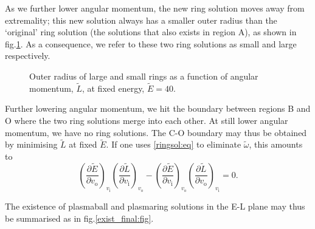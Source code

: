 \documentclass[12pt,a4paper]{article}
\newcommand{\pdiffc}[3][\rule{0mm}{0mm}]{\left (\frac{\partial #2}{\partial {#3}}\right )_{\!\!#1}}
\newcommand{\tB}{\hat{\mathrm{B}}}
\newcommand{\tE}{\widetilde{E}}
\newcommand{\tL}{\widetilde{L}}
\newcommand{\vi}{v_\mathrm{i}}
\newcommand{\vo}{v_\mathrm{o}}
\newcommand{\tw}{\widetilde{\omega}}
\begin{document}
As we further lower angular momentum, the new ring solution moves
away from extremality; this new solution always has a smaller outer
radius than the `original' ring solution (the solutions that also
exists in region A), as shown in fig.\ref{outer:fig}. As a
consequence, we refer to these two ring solutions as small and large
respectively.

\begin{figure}
%
 \begin{center}
   
 \caption{Outer radius of large and small rings as a function of
angular momentum, $\tL$, at fixed energy,
$\tE=40$.}\label{outer:fig}
 \end{center}
\end{figure}


Further lowering angular momentum, we hit the boundary between
regions B and O where the two ring solutions merge into each other.
At still lower angular momentum, we have no ring solutions. The C-O
boundary may thus be obtained by minimising $\tL$ at fixed $\tE$. If
one uses \eqref{ringsol:eq} to eliminate $\tw$, this amounts to
%
\begin{equation*}
  \pdiffc[\vi]{\tE}{\vo}\pdiffc[\vo]{\tL}{\vi}
  -\pdiffc[\vo]{\tE}{\vi}\pdiffc[\vi]{\tL}{\vo}
    =0.
\end{equation*}
%

The existence of plasmaball and plasmaring solutions in the E-L
plane may thus be summarised as in fig.\ref{exist_final:fig}.




%
\end{document}
